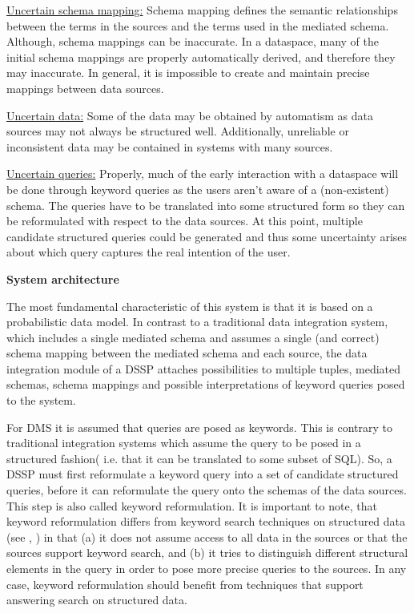 \uline{Uncertain schema mapping:} Schema mapping defines the semantic relationships between the terms in the sources and the terms used in the mediated schema. Although, schema mappings can be inaccurate. In a dataspace, many of the initial schema mappings are properly automatically derived, and therefore they may inaccurate. In general, it is impossible to create and maintain precise mappings between data sources. 

\uline{Uncertain data:} Some of the data may be obtained by automatism as data sources may not always be structured well. Additionally, unreliable or inconsistent data may be contained in systems with many sources. 

\uline{Uncertain queries:} Properly, much of the early interaction with a dataspace will be done through keyword queries as the users aren't aware of a (non-existent) schema. The queries have to be translated into some structured form so they can be reformulated with respect to the data sources. At this point, multiple candidate structured queries could be generated and thus some uncertainty arises about which query captures the real intention of the user.

\textbf{System architecture}

The most fundamental characteristic of this system is that it is based on a probabilistic data model. In contrast to a traditional data integration system, which includes a single mediated schema and assumes a single (and correct) schema mapping between the mediated schema and each source, the data integration module of a DSSP attaches possibilities to multiple tuples, mediated schemas, schema mappings and possible interpretations of  keyword queries posed to the system. 

For DMS it is assumed that queries are posed as keywords. This is contrary to traditional integration systems which assume the query to be posed in a structured fashion( i.e. that it can be translated to some subset of SQL). So, a DSSP must first reformulate a keyword query into a set of candidate structured queries, before it can reformulate the query onto the schemas of the data sources. This step is also called keyword reformulation.  It is important to note, that keyword reformulation differs from keyword search techniques on structured data (see \cite{994693}, \cite{Hristidis:2002:DKS:1287369.1287427}) in that (a) it does not assume access to all data in the sources or that the sources support keyword search, and (b) it tries to distinguish different structural elements in the query in order to pose more precise queries to the sources. In any case, keyword reformulation should benefit from techniques that support answering search on structured data.

